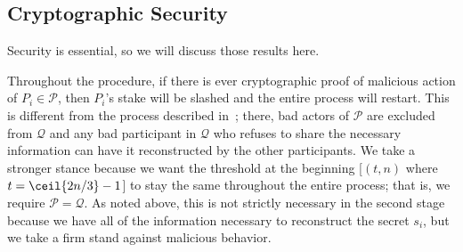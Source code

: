 \subsection{Cryptographic Security}
\label{ssec:security}


Security is essential, so we will discuss those results here.

Throughout the procedure, if there is ever cryptographic proof of
malicious action of $P_{i}\in\mathcal{P}$, then $P_{i}$'s stake
will be slashed and the entire process will restart.
This is different from the process described in~\cite{ethdkg};
there, bad actors of $\mathcal{P}$ are excluded from $\mathcal{Q}$
and any bad participant in $\mathcal{Q}$ who refuses to share
the necessary information can have it reconstructed by the other
participants.
We take a stronger stance because we want the threshold at the
beginning [$(t,n)$ where $t = \ceil{2n/3}-1$] to stay the same
throughout the entire process; that is, we require
$\mathcal{P} = \mathcal{Q}$.
As noted above, this is not strictly necessary in the second stage
because we have all of the information necessary to reconstruct
the secret $s_{i}$, but we take a firm stand against malicious
behavior.

